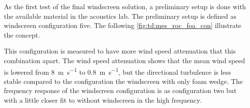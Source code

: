 As the first test of the final windscreen solution, a preliminary setup is done with the available material in the acoustics lab. The preliminary setup is defined as windscreen configuration five. The following \autoref{fig:td:mes_roc_foa_con} illustrate the concept.


This configuration is measured to have more wind speed attenuation that this combination apart. The wind speed attenuation shows that the mean wind speed is lowered from \SI{8}{\meter\per\second} to \SI{0.8}{\meter\per\second}, but the directional turbulence is less stable compared to the configuration the windscreen with only foam wedge. The frequency response of the windscreen configuration is as configuration two but with a little closer fit to without windscreen in the high frequency.